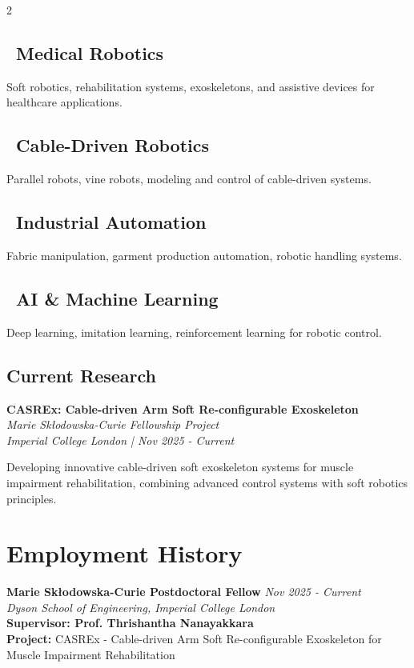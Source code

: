 \documentclass[11pt,a4paper]{article}
\newcommand{\cvitemdetailed}[5]{
  \textbf{#1} \hfill \textit{#2}\\
  \textit{#3}\\
  \textbf{#4}\\
  #5
  \vspace{0.3cm}
}
\begin{document}
\begin{multicols}{2}
\subsection*{\faHospital\ Medical Robotics}
Soft robotics, rehabilitation systems, exoskeletons, and assistive devices for healthcare applications.

\subsection*{\faRobot\ Cable-Driven Robotics}
Parallel robots, vine robots, modeling and control of cable-driven systems.

\columnbreak

\subsection*{\faIndustry\ Industrial Automation}
Fabric manipulation, garment production automation, robotic handling systems.

\subsection*{\faBrain\ AI \& Machine Learning}
Deep learning, imitation learning, reinforcement learning for robotic control.
\end{multicols}

\vspace{0.3cm}

\subsection*{Current Research}
\textbf{CASREx: Cable-driven Arm Soft Re-configurable Exoskeleton}\\
\textit{Marie Skłodowska-Curie Fellowship Project}\\
\textit{Imperial College London | Nov 2025 - Current}

Developing innovative cable-driven soft exoskeleton systems for muscle impairment rehabilitation, combining advanced control systems with soft robotics principles.

\section*{Employment History}

\cvitemdetailed{Marie Skłodowska-Curie Postdoctoral Fellow}{Nov 2025 - Current}{Dyson School of Engineering, Imperial College London}{Supervisor: Prof. Thrishantha Nanayakkara}{
\textbf{Project:} CASREx - Cable-driven Arm Soft Re-configurable Exoskeleton for Muscle Impairment Rehabilitation
}
\end{document}
